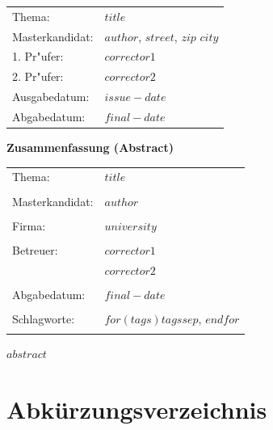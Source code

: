 \documentclass[$if(fontsize)$$fontsize$,$endif$$if(lang)$$babel-lang$,$endif$$if(papersize)$$papersize$paper,$endif$$for(classoption)$$classoption$$sep$,$endfor$]{$documentclass$}
\begin{document}
\begin{singlespace}
\begin{center}
\begin{tabular}{p{3cm}p{10cm}}
Thema: & \textbf{\large $title$} \\[15ex]
Masterkandidat: & $author$, $street$, $zip$ $city$ \\[15ex]
1. Pr"ufer: & $corrector1$ \\
2. Pr"ufer: & $corrector2$ \\[25ex]
Ausgabedatum: & $issue-date$ \\
Abgabedatum: & $final-date$ \\
\end{tabular}
\end{center}
\newpage


\begin{center}
{\Large \textbf{Zusammenfassung (Abstract)}}
\end{center}

\bigskip

\begin{center}
  \begin{tabular}{p{2.8cm}p{10cm}}
    Thema: & $title$ \\
     & \\
    Masterkandidat: & $author$ \\
     & \\
    Firma: & $university$ \\
     & \\
    Betreuer: & $corrector1$  \\[.5ex]
     &  $corrector2$ \\
     & \\
    Abgabedatum: & $final-date$ \\
     & \\
    Schlagworte: & $for(tags)$$tags$$sep$, $endfor$ \\
     & \\
  \end{tabular}
\end{center}

\bigskip

\noindent
$abstract$

\end{singlespace}
\newpage


\setcounter{tocdepth}{$toc-depth$}
\tableofcontents
\listoffigures
\listoftables

\chapter*{Abkürzungsverzeichnis} 
\end{document}
